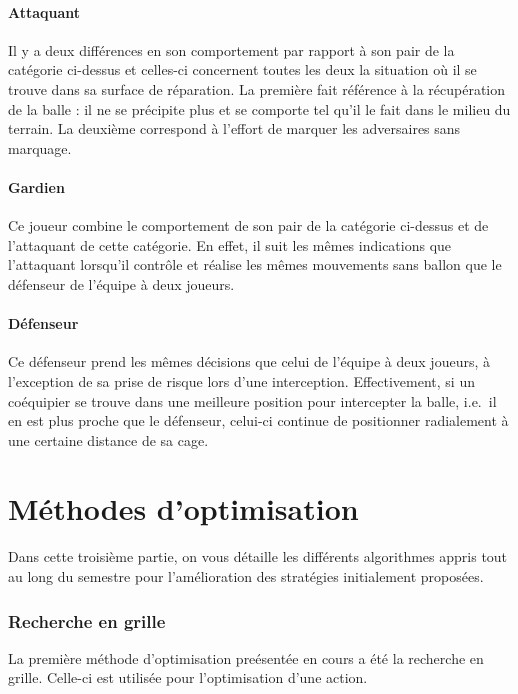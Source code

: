 \documentclass[12pt,a4paper]{article}
\begin{document}
\subsection*{Attaquant}
Il y a deux diff\'erences en son comportement par rapport \`a son pair 
de la cat\'egorie ci-dessus et celles-ci concernent toutes les deux la 
situation o\`u il se trouve dans sa surface de r\'eparation. La premi\`ere fait 
r\'ef\'erence \`a la r\'ecup\'eration de la balle : il ne se 
pr\'ecipite plus et se comporte tel qu'il le fait dans le milieu du terrain. La 
deuxi\`eme correspond \`a l'effort de marquer les adversaires sans 
marquage.

\subsection*{Gardien}
Ce joueur combine le comportement de son pair de la cat\'egorie ci-dessus et de l'attaquant de cette cat\'egorie. En effet, il suit les m\^emes indications que l'attaquant lorsqu'il contr\^ole et r\'ealise les m\^emes mouvements sans ballon que le d\'efenseur de l'\'equipe \`a deux joueurs.

\subsection*{D\'efenseur}
Ce d\'efenseur prend les m\^emes d\'ecisions que celui de l'\'equipe \`a deux joueurs, \`a l'exception de sa prise de risque lors d'une interception. Effectivement, si un co\'equipier se trouve dans une meilleure position pour intercepter la balle, i.e.\ il en est plus proche que le d\'efenseur, celui-ci continue de positionner radialement \`a une certaine distance de sa cage.

\newpage

\part{M\'ethodes d'optimisation}
Dans cette troisi\`eme partie, on vous d\'etaille les diff\'erents algorithmes 
appris tout au long du semestre pour l'am\'elioration des strat\'egies 
initialement propos\'ees.

\section{Recherche en grille}
La premi\`ere m\'ethode d'optimisation pre\'esent\'ee en cours a \'et\'e la 
recherche en grille. Celle-ci est utilis\'ee pour l'optimisation d'une 
action.
\end{document}
